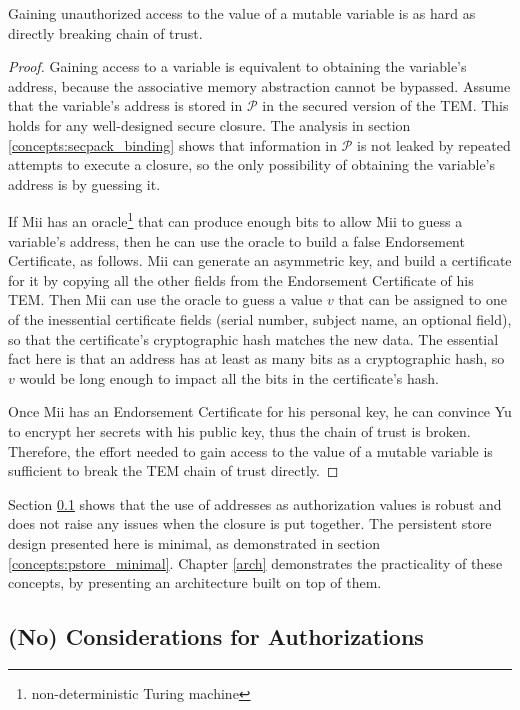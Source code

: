 \begin{theorem*}
Gaining unauthorized access to the value of a mutable variable is as hard as
directly breaking chain of trust.
\end{theorem*}
\begin{proof}
Gaining access to a variable is equivalent to obtaining the variable's address,
because the associative memory abstraction cannot be bypassed. Assume that the
variable's address is stored in $\mathcal P$ in the secured version of the TEM.
This holds for any well-designed secure closure. The analysis in section
\ref{concepts:secpack_binding} shows that information in $\mathcal P$ is not
leaked by repeated attempts to execute a closure, so the only possibility of
obtaining the variable's address is by guessing it.

If Mii has an oracle\footnote{non-deterministic Turing machine} that can
produce enough bits to allow Mii to guess a variable's address, then he can use
the oracle to build a false Endorsement Certificate, as follows. Mii can
generate an asymmetric key, and build a certificate for it by copying all the
other fields from the Endorsement Certificate of his TEM. Then Mii can use the
oracle to guess a value $v$ that can be assigned to one of the inessential
certificate fields (serial number, subject name, an optional field), so that
the certificate's cryptographic hash matches the new data. The essential fact
here is that an address has at least as many bits as a cryptographic hash, so
$v$ would be long enough to impact all the bits in the certificate's hash. 

Once Mii has an Endorsement Certificate for his personal key, he can convince
Yu to encrypt her secrets with his public key, thus the chain of trust is
broken. Therefore, the effort needed to gain access to the value
of a mutable variable is sufficient to break the TEM chain of trust directly.
\end{proof}

Section \ref{concepts:pstore_auth} shows that the use of addresses as
authorization values is robust and does not raise any issues when the closure
is put together. The persistent store design presented here is minimal, as
demonstrated in section \ref{concepts:pstore_minimal}. Chapter
\ref{arch} demonstrates the practicality of these concepts, by presenting an
architecture built on top of them.

\subsection{(No) Considerations for Authorizations}\label{concepts:pstore_auth}

